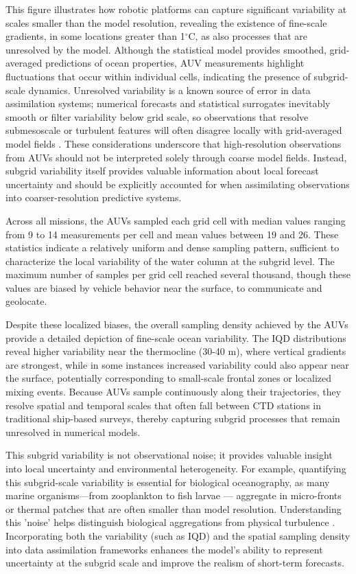 This figure illustrates how robotic platforms can capture significant
variability at scales smaller than the model resolution, revealing the
existence of fine-scale gradients, in some locations greater than
1$^{\circ}$C, as also processes that are unresolved by the
model. Although the statistical model provides smoothed, grid-averaged
predictions of ocean properties, AUV measurements highlight
fluctuations that occur within individual cells, indicating the
presence of subgrid-scale dynamics. Unresolved variability is a known
source of error in data assimilation systems; numerical forecasts and
statistical surrogates inevitably smooth or filter variability below
grid scale, so observations that resolve submesoscale or turbulent
features will often disagree locally with grid-averaged model fields
\parencite{oke2008representation,janjic2018representation}. These
considerations underscore that high-resolution observations from AUVs
should not be interpreted solely through coarse model fields. Instead,
subgrid variability itself provides valuable information about local
forecast uncertainty and should be explicitly accounted for when
assimilating observations into coarser-resolution predictive systems.

Across all missions, the AUVs sampled each grid cell with median
values ranging from 9 to 14 measurements per cell and mean values
between 19 and 26. These statistics indicate a relatively uniform and
dense sampling pattern, sufficient to characterize the local
variability of the water column at the subgrid level. The maximum
number of samples per grid cell reached several thousand, though these
values are biased by vehicle behavior near the surface, to communicate
and geolocate.

Despite these localized biases, the overall sampling density achieved
by the AUVs provide a detailed depiction of fine-scale ocean
variability. The IQD distributions reveal higher variability near the
thermocline (30-40 m), where vertical gradients are strongest, while in some
instances increased variability could also appear near the surface,
potentially corresponding to small-scale frontal zones or localized
mixing events. Because AUVs sample continuously along their
trajectories, they resolve spatial and temporal scales that often fall
between CTD stations in traditional ship-based surveys, thereby
capturing subgrid processes that remain unresolved in numerical
models.

This subgrid variability is not observational noise; it provides
valuable insight into local uncertainty and environmental
heterogeneity. For example, quantifying this subgrid-scale variability
is essential for biological oceanography, as many marine
organisms—from zooplankton to fish larvae — aggregate in micro-fronts
or thermal patches that are often smaller than model
resolution. Understanding this 'noise' helps distinguish biological
aggregations from physical turbulence
\parencite{visser2002turbulence}. Incorporating both the variability (such
as IQD) and the spatial sampling density into data assimilation
frameworks enhances the model’s ability to represent uncertainty at
the subgrid scale and improve the realism of short-term forecasts.

